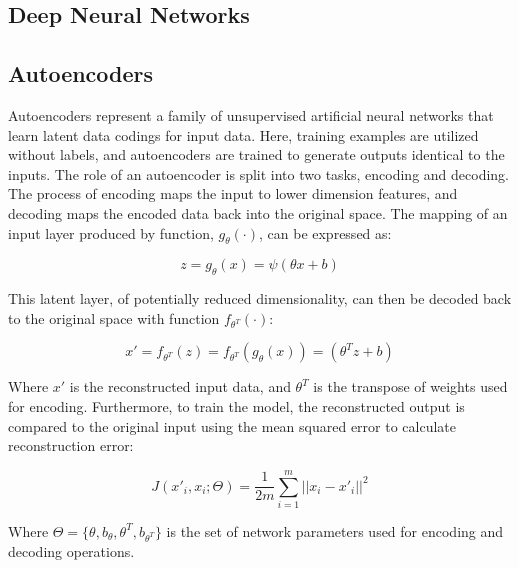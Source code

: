 \subsection{Deep Neural Networks}


\subsection{Autoencoders}


Autoencoders represent a family of unsupervised artificial neural networks that learn latent data codings for input data. Here, training examples are utilized without labels, and autoencoders are trained to generate outputs identical to the inputs. The role of an autoencoder is split into two tasks, encoding and decoding. The process of encoding maps the input to lower dimension features, and decoding maps the encoded data back into the original space. The mapping of an input layer produced by function, $g_{\theta}(\cdot)$, can be expressed as:
 
\begin{equation}
z = g_{\theta}(x) = \psi(\theta x + b)
\end{equation}

This latent layer, of potentially reduced dimensionality, can then be decoded back to the original space with function $f_{\theta^{T}}(\cdot)$:

\begin{equation}
x' = f_{\theta^{T}}(z) =  f_{\theta^{T}}(g_{\theta}(x)) = (\theta^{T}z + b)
\end{equation}

Where $x'$ is the reconstructed input data, and $\theta^{T}$ is the transpose of weights used for encoding. Furthermore, to train the model, the reconstructed output is compared to the original input using the mean squared error to calculate reconstruction error:

\begin{equation}
J(x'_{i},x_{i};\Theta) = \frac{1}{2m}{\sum^{m}_{i=1}} ||x_i - x'_i||^2
\end{equation}

Where $\Theta = \{\theta, b_\theta,\theta^{T}, b_{\theta^{T}}\}$ is the set of network parameters used for encoding and decoding operations. 

